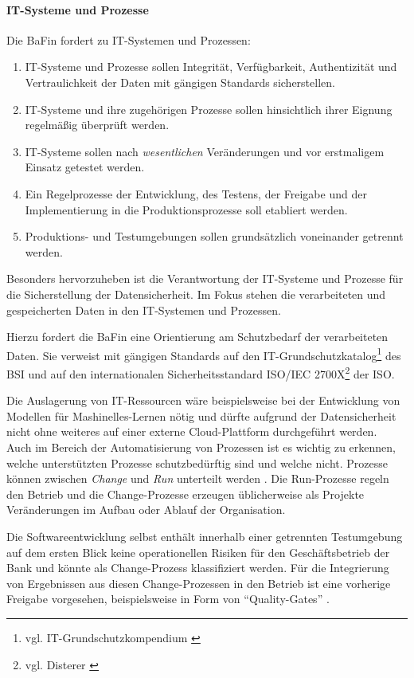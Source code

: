 \paragraph{IT-Systeme und Prozesse}
Die \ac{BaFin} \cite{MaRisk:2017} fordert zu IT-Systemen und Prozessen:
\begin{enumerate}
    \item IT-Systeme und Prozesse sollen Integrität, Verfügbarkeit, Authentizität und Vertraulichkeit der Daten mit gängigen Standards sicherstellen.
    \item IT-Systeme und ihre zugehörigen Prozesse sollen hinsichtlich ihrer Eignung regelmäßig überprüft werden.
    \item IT-Systeme sollen nach \emph{wesentlichen} Veränderungen und vor erstmaligem Einsatz getestet werden.
    \item Ein Regelprozesse der Entwicklung, des Testens, der Freigabe und der Implementierung in die Produktionsprozesse soll etabliert werden. 
    \item Produktions- und Testumgebungen sollen grundsätzlich voneinander getrennt werden.
\end{enumerate}
%
Besonders hervorzuheben ist die Verantwortung der IT-Systeme und Prozesse für die Sicherstellung der Datensicherheit. Im Fokus stehen die verarbeiteten und gespeicherten Daten in den IT-Systemen und Prozessen. 

Hierzu fordert die BaFin \cite{MaRisk:2017} eine Orientierung am Schutzbedarf der verarbeiteten Daten. Sie verweist mit gängigen Standards auf den IT-Grundschutzkatalog\footnote{vgl. IT-Grundschutzkompendium \cite{IT-Grundschutz:2020}} des \ac{BSI} und auf den internationalen Sicherheitsstandard ISO/IEC 2700X\footnote{vgl. Disterer \cite{Disterer2013}} der \ac{ISO}.

Die Auslagerung von IT-Ressourcen wäre beispielsweise bei der Entwicklung von Modellen für Mashinelles-Lernen nötig und dürfte aufgrund der Datensicherheit nicht ohne weiteres auf einer externe Cloud-Plattform durchgeführt werden. 
\medskip
\\
Auch im Bereich der Automatisierung von Prozessen ist es wichtig zu erkennen, welche unterstützten Prozesse schutzbedürftig sind und welche nicht. Prozesse können zwischen \emph{Change} und \emph{Run} unterteilt werden \cite{}. Die Run-Prozesse regeln den Betrieb und die Change-Prozesse erzeugen üblicherweise als Projekte Veränderungen im Aufbau oder Ablauf der Organisation.

Die Softwareentwicklung selbst enthält innerhalb einer getrennten Testumgebung auf dem ersten Blick keine operationellen Risiken für den Geschäftsbetrieb der Bank und könnte als Change-Prozess klassifiziert werden. Für die Integrierung von Ergebnissen aus diesen Change-Prozessen in den Betrieb ist eine vorherige Freigabe vorgesehen, beispielsweise in Form von \enquote{Quality-Gates} \cite{mci/Disterer2011}.

